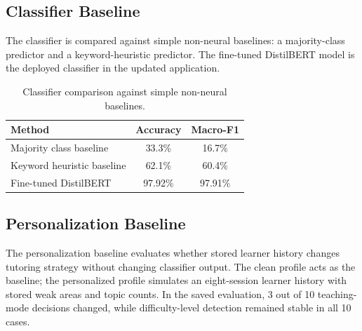 \documentclass[11pt,a4paper]{article}
\begin{document}
\subsection{Classifier Baseline}

The classifier is compared against simple non-neural baselines: a majority-class predictor and a keyword-heuristic predictor. The fine-tuned DistilBERT model is the deployed classifier in the updated application.

\begin{table}[H]
\centering
\begin{tabular}{lcc}
\toprule
\textbf{Method} & \textbf{Accuracy} & \textbf{Macro-F1} \\
\midrule
Majority class baseline & 33.3\% & 16.7\% \\
Keyword heuristic baseline & 62.1\% & 60.4\% \\
Fine-tuned DistilBERT & 97.92\% & 97.91\% \\
\bottomrule
\end{tabular}
\caption{Classifier comparison against simple non-neural baselines.}
\end{table}


\subsection{Personalization Baseline}

The personalization baseline evaluates whether stored learner history changes tutoring strategy without changing classifier output. The clean profile acts as the baseline; the personalized profile simulates an eight-session learner history with stored weak areas and topic counts. In the saved evaluation, 3 out of 10 teaching-mode decisions changed, while difficulty-level detection remained stable in all 10 cases.
\end{document}
